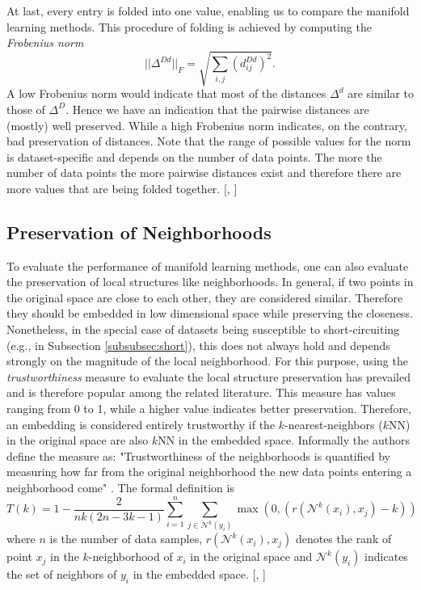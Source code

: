 At last, every entry is folded into one value, enabling us to compare the manifold learning methods. This procedure of folding is achieved by computing the \textit{Frobenius norm}
\begin{equation}
    ||\Delta^{Dd}||_F = \sqrt{\sum_{i,j} (d_{ij}^{Dd})^2}.
\end{equation}
A low Frobenius norm would indicate that most of the distances $\Delta^d$ are similar to those of $\Delta^D$. Hence we have an indication that the pairwise distances are (mostly) well preserved. While a high Frobenius norm indicates, on the contrary, bad preservation of distances. Note that the range of possible values for the norm is dataset-specific and depends on the number of data points. The more the number of data points the more pairwise distances exist and therefore there are more values that are being folded together. [\cite{wiki_dist_matrix}, \cite{wiki_matrix_norm}]

\subsection{Preservation of Neighborhoods} \label{subsec:kNN}

To evaluate the performance of manifold learning methods, one can also evaluate the preservation of local structures like neighborhoods. In general, if two points in the original space are close to each other, they are considered similar. Therefore they should be embedded in low dimensional space while preserving the closeness. Nonetheless, in the special case of datasets being susceptible to short-circuiting (e.g., in Subsection \ref{subsubsec:short}), this does not always hold and depends strongly on the magnitude of the local neighborhood. For this purpose, using the \textit{trustworthiness} measure to evaluate the local structure preservation has prevailed and is therefore popular among the related literature. This measure has values ranging from 0 to 1, while a higher value indicates better preservation. Therefore, an embedding is considered entirely trustworthy if the $k$-nearest-neighbors ($k$NN) in the original space are also $k$NN in the embedded space. Informally the authors define the measure as: "Trustworthiness of the neighborhoods is quantified by measuring how far from the original neighborhood the new data points entering a neighborhood come" \cite{trustworthiness}. The formal definition is
\begin{equation}
    T(k)=1-\frac{2}{nk(2n-3k-1)}\sum^n_{i=1}\sum_{j\in\mathcal{N}^k(y_i)}\max(0,(r(\mathcal{N}^k(x_i),x_j)-k))
\end{equation}
where $n$ is the number of data samples, $r(\mathcal{N}^k(x_i),x_j)$ denotes the rank of point $x_j$ in the $k$-neighborhood of $x_i$ in the original space and $\mathcal{N}^k(y_i)$ indicates the set of neighbors of $y_i$ in the embedded space. [\cite{trustworthiness}, \cite{Gisbrecht15}]

